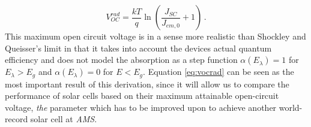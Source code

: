 \documentclass[a4paper]{article}
\begin{document}
\begin{equation}
\label{eq:vocrad}
V_{OC}^{rad}=\frac{kT}{q} \ln (\frac{J_{SC}}{J_{em,0}}+1) \, .
\end{equation}
This maximum open circuit voltage is in a sense more realistic than Shockley and Queisser's limit in that it takes into account the devices actual quantum efficiency and does not model the absorption as a step function $\alpha(E_{\lambda})=1$ for $E_{\lambda}>E_g$ and  $\alpha(E_{\lambda})=0$  for $E<E_g$. Equation \eqref{eq:vocrad} can be seen as the most important result of this derivation, since it will allow us to compare the performance of solar cells based on their maximum attainable open-circuit voltage, \emph{the} parameter which has to be improved upon to achieve another world-record solar cell at \emph{AMS}.
\end{document}
